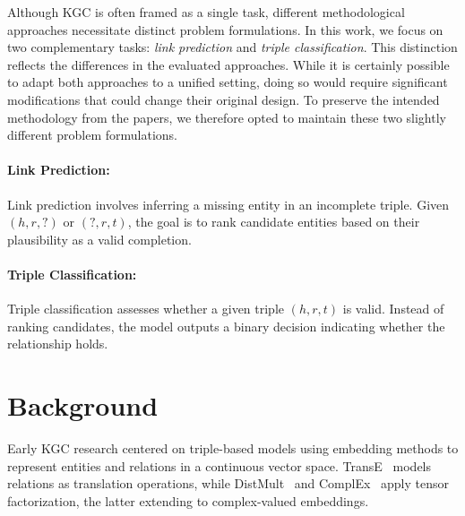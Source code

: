 \documentclass[12pt,a4paper]{article}
\begin{document}
Although KGC is often framed as a single task, different methodological approaches necessitate distinct problem formulations.
In this work, we focus on two complementary tasks: \emph{link prediction} and \emph{triple classification}.
This distinction reflects the differences in the evaluated approaches.
While it is certainly possible to adapt both approaches to a unified setting, doing so would require significant modifications that could change their original design.
To preserve the intended methodology from the papers, we therefore opted to maintain these two slightly different problem formulations.

\paragraph{Link Prediction:}
Link prediction involves inferring a missing entity in an incomplete triple. Given \( (h, r, ?) \) or \( (?, r, t) \), the goal is to rank candidate entities based on their plausibility as a valid completion.

\paragraph{Triple Classification:}
Triple classification assesses whether a given triple \( (h, r, t) \) is valid. Instead of ranking candidates, the model outputs a binary decision indicating whether the relationship holds.

%
%


\section{Background}\label{sec:background}

Early KGC research centered on triple-based models using embedding methods to represent entities and relations in a continuous vector space.
TransE~\cite{bordes2013translating} models relations as translation operations, while DistMult~\cite{yang2014embedding} and ComplEx~\cite{trouillon2016complex} apply tensor factorization, the latter extending to complex-valued embeddings.

\end{document}
